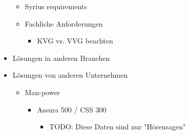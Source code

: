 \documentclass{hwz}
\begin{document}
\begin{itemize}
\begin{itemize}
		\item Syrius requirements
		\item Fachliche Anforderungen
        \begin{itemize}
    		\item KVG vs. VVG beachten
        \end{itemize}
    \end{itemize}
    \item Lösungen in anderen Branchen
    \item Lösungen von anderen Unternehmen
    \begin{itemize}
		\item Man-power
        \begin{itemize}
		    \item Assura 500 / CSS 300
            \begin{itemize}
			    \item TODO: Diese Daten sind nur "Hörensagen"
            \end{itemize}
        \end{itemize}
    \end{itemize}
\end{itemize}
\end{document}
